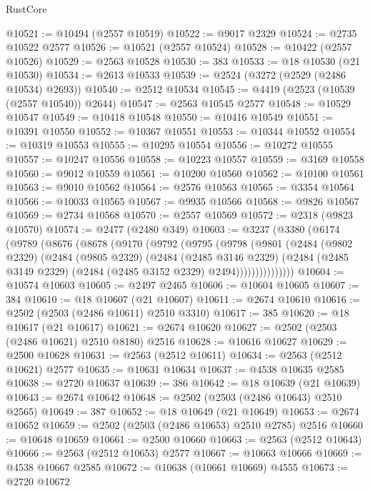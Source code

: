 \begin{lexlean}{RustCore}
\begin{coremodule}
@10521 := @10494 (@2557 @10519)
@10522 := @9017 @2329
@10524 := @2735 @10522 @2577
@10526 := @10521 (@2557 @10524)
@10528 := @10422 (@2557 @10526)
@10529 := @2563 @10528
@10530 := 383
@10533 := @18 @10530 (@21 @10530)
@10534 := @2613 @10533
@10539 := @2524 (@3272 (@2529 (@2486 @10534) @2693))
@10540 := @2512 @10534
@10545 := @4419 (@2523 (@10539 (@2557 @10540)) @2644)
@10547 := @2563 @10545 @2577
@10548 := @10529 @10547
@10549 := @10418 @10548
@10550 := @10416 @10549
@10551 := @10391 @10550
@10552 := @10367 @10551
@10553 := @10344 @10552
@10554 := @10319 @10553
@10555 := @10295 @10554
@10556 := @10272 @10555
@10557 := @10247 @10556
@10558 := @10223 @10557
@10559 := @3169 @10558
@10560 := @9012 @10559
@10561 := @10200 @10560
@10562 := @10100 @10561
@10563 := @9010 @10562
@10564 := @2576 @10563
@10565 := @3354 @10564
@10566 := @10033 @10565
@10567 := @9935 @10566
@10568 := @9826 @10567
@10569 := @2734 @10568
@10570 := @2557 @10569
@10572 := @2318 (@9823 @10570)
@10574 := @2477 (@2480 @349)
@10603 := @3237
    (@3380
      (@6174
        (@9789
          (@8676
            (@8678
              (@9170
                (@9792
                  (@9795
                    (@9798
                      (@9801
                        (@2484
                          (@9802 @2329)
                          (@2484
                            (@9805 @2329)
                            (@2484
                              (@2485 @3146 @2329)
                              (@2484
                                (@2485 @3149 @2329)
                                (@2484 (@2485 @3152 @2329) @2494)))))))))))))))
@10604 := @10574 @10603
@10605 := @2497 @2465
@10606 := @10604 @10605
@10607 := 384
@10610 := @18 @10607 (@21 @10607)
@10611 := @2674 @10610
@10616 := @2502 (@2503 (@2486 @10611) @2510 @3310)
@10617 := 385
@10620 := @18 @10617 (@21 @10617)
@10621 := @2674 @10620
@10627 := @2502 (@2503 (@2486 @10621) @2510 @8180) @2516
@10628 := @10616 @10627
@10629 := @2500 @10628
@10631 := @2563 (@2512 @10611)
@10634 := @2563 (@2512 @10621) @2577
@10635 := @10631 @10634
@10637 := @4538 @10635 @2585
@10638 := @2720 @10637
@10639 := 386
@10642 := @18 @10639 (@21 @10639)
@10643 := @2674 @10642
@10648 := @2502 (@2503 (@2486 @10643) @2510 @2565)
@10649 := 387
@10652 := @18 @10649 (@21 @10649)
@10653 := @2674 @10652
@10659 := @2502 (@2503 (@2486 @10653) @2510 @2785) @2516
@10660 := @10648 @10659
@10661 := @2500 @10660
@10663 := @2563 (@2512 @10643)
@10666 := @2563 (@2512 @10653) @2577
@10667 := @10663 @10666
@10669 := @4538 @10667 @2585
@10672 := @10638 (@10661 @10669) @4555
@10673 := @2720 @10672

\end{coremodule}
\end{lexlean}
